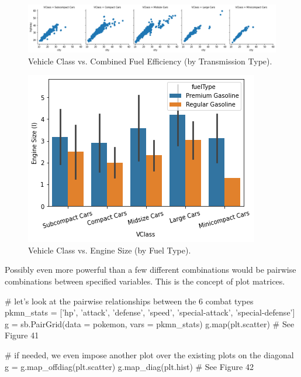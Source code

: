 \begin{figure}
	\includegraphics[width=\textwidth,height=\textheight,keepaspectratio]{images/figure39.png}
	\caption{Vehicle Class vs. Combined Fuel Efficiency (by Transmission Type).}\label{fig:figure39}
\end{figure}

\begin{figure}
	\includegraphics{images/figure40.png}
	\caption{Vehicle Class vs. Engine Size (by Fuel Type).}\label{fig:figure40}
\end{figure}

Possibly even more powerful than a few different combinations would be pairwise combinations between specified variables. This is the concept of plot matrices.

\begin{python}
	# let's look at the pairwise relationships between the 6 combat types
	pkmn_stats = ['hp', 'attack', 'defense', 'speed', 'special-attack', 'special-defense']
	g = sb.PairGrid(data = pokemon, vars = pkmn_stats)
	g.map(plt.scatter)
	# See Figure 41
	
	# if needed, we even impose another plot over the existing plots on the diagonal
	g = g.map_offdiag(plt.scatter)
	g.map_diag(plt.hist)
	# See Figure 42
\end{python}

